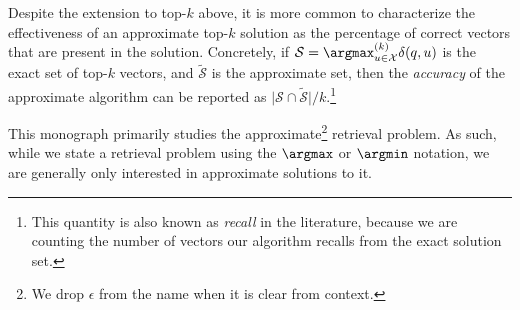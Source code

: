 Despite the extension to top-$k$ above, it is more common
to characterize the effectiveness of an approximate top-$k$ solution
as the percentage of correct vectors that are present in the solution. Concretely,
if $\mathcal{S} = \argmax^{(k)}_{u \in \mathcal{X}} \delta(q, u)$ is the exact set of top-$k$ vectors,
and $\tilde{\mathcal{S}}$ is the approximate set, then the \emph{accuracy} of the approximate algorithm
can be reported as $\lvert \mathcal{S} \cap \tilde{\mathcal{S}} \rvert / k$.\footnote{
This quantity is also known as \emph{recall} in the literature, because we
are counting the number of vectors our algorithm recalls from the exact solution set.}

This monograph primarily studies the approximate\footnote{
We drop $\epsilon$ from the name when it is clear from context.} retrieval problem.
As such, while we state a retrieval problem using the $\argmax$ or $\argmin$
notation, we are generally only interested in approximate solutions to it.



